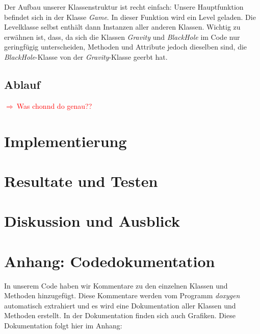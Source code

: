 \documentclass[12pt,a4paper]{scrartcl}
\newcommand{\todo}[1]{\begin{Large}\textcolor{red}{$\Rightarrow ~$#1}\end{Large}}
\newcommand{\inmilestonetwo}{\vspace{0.75cm} \framebox[1.1\width]{
\begin{large}
\textcolor{red}{Die Dokumentation dieses Abschnittes ist für Milestone II vorgesehen.}
\end{large}}}
\begin{document}
Der Aufbau unserer Klassenstruktur ist recht einfach: Unsere Hauptfunktion befindet sich in der Klasse
\textit{Game}. In dieser Funktion wird ein Level geladen. Die Levelklasse selbst enthält dann
Instanzen aller anderen Klassen. Wichtig zu erwähnen ist, dass, da sich die Klassen \textit{Gravity}
und \textit{BlackHole} im Code nur geringfügig unterscheiden, Methoden und Attribute jedoch dieselben sind,
die \textit{BlackHole}-Klasse von der \textit{Gravity}-Klasse geerbt hat.

\subsection{Ablauf}
\inmilestonetwo
\todo{Was chonnd do genau??}

\section{Implementierung}

\fontsize{12pt}{14pt}\selectfont

\section{Resultate und Testen}
\inmilestonetwo
\section{Diskussion und Ausblick}
\inmilestonetwo


\clearpage
\newpage

\section*{Anhang: Codedokumentation}
In unserem Code haben wir Kommentare zu den einzelnen Klassen und Methoden hinzugefügt.
Diese Kommentare werden vom Programm \textit{doxygen} automatisch extrahiert und es wird eine
Dokumentation aller Klassen und Methoden erstellt. In der Dokumentation finden sich auch
Grafiken. Diese Dokumentation folgt hier im Anhang:\\

%
\end{document}
